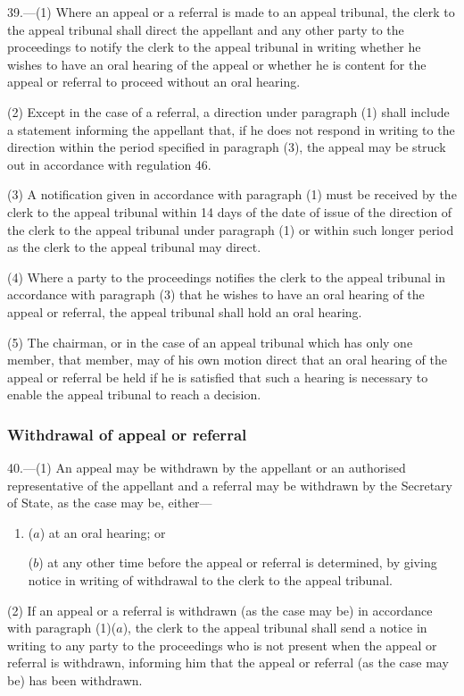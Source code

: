 \documentclass[12pt,a4paper]{article}
\begin{document}
39.—(1) Where an appeal or a referral is made to an appeal tribunal, the clerk to the appeal tribunal shall direct the appellant and any other party to the proceedings to notify the clerk to the appeal tribunal in writing whether he wishes to have an oral hearing of the appeal or whether he is content for the appeal or referral to proceed without an oral hearing.

(2) Except in the case of a referral, a direction under paragraph (1) shall include a statement informing the appellant that, if he does not respond in writing to the direction within the period specified in paragraph (3), the appeal may be struck out in accordance with regulation 46.

(3) A notification given in accordance with paragraph (1) must be received by the clerk to the appeal tribunal within 14 days of the date of issue of the direction of the clerk to the appeal tribunal under paragraph (1) or within such longer period as the clerk to the appeal tribunal may direct.

(4) Where a party to the proceedings notifies the clerk to the appeal tribunal in accordance with paragraph (3) that he wishes to have an oral hearing of the appeal or referral, the appeal tribunal shall hold an oral hearing.

(5) The chairman, or in the case of an appeal tribunal which has only one member, that member, may of his own motion direct that an oral hearing of the appeal or referral be held if he is satisfied that such a hearing is necessary to enable the appeal tribunal to reach a decision.

\subsubsection[40. Withdrawal of appeal or referral]{Withdrawal of appeal or referral}

40.—(1) An appeal may be withdrawn by the appellant or an authorised representative of the appellant and a referral may be withdrawn by the Secretary of State, as the case may be, either—
\begin{enumerate}\item[]
($a$) at an oral hearing; or

($b$) at any other time before the appeal or referral is determined, by giving notice in writing of withdrawal to the clerk to the appeal tribunal.
\end{enumerate}

(2) If an appeal or a referral is withdrawn (as the case may be) in accordance with paragraph (1)($a$), the clerk to the appeal tribunal shall send a notice in writing to any party to the proceedings who is not present when the appeal or referral is withdrawn, informing him that the appeal or referral (as the case may be) has been withdrawn.
\end{document}
